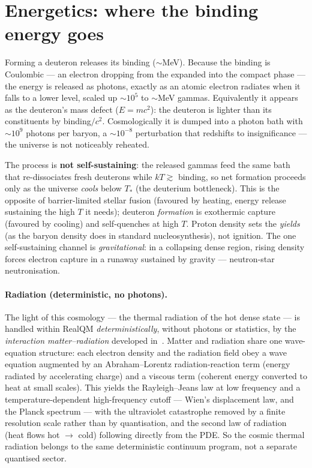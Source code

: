 \documentclass[11pt]{article}
\begin{document}
\section{Energetics: where the binding energy goes}\label{sec:energetics}
Forming a deuteron releases its binding (${\sim}$MeV). Because the binding is Coulombic --- an
electron dropping from the expanded into the compact phase --- the energy is released as photons,
exactly as an atomic electron radiates when it falls to a lower level, scaled up ${\sim}10^5$ to
${\sim}$MeV gammas. Equivalently it appears as the deuteron's mass defect ($E=mc^2$): the deuteron is
lighter than its constituents by binding$/c^2$. Cosmologically it is dumped into a photon bath with
${\sim}10^9$ photons per baryon, a ${\sim}10^{-8}$ perturbation that redshifts to insignificance ---
the universe is not noticeably reheated.

The process is \textbf{not self-sustaining}: the released gammas feed the same bath that re-dissociates
fresh deuterons while $kT\gtrsim$ binding, so net formation proceeds only as the universe \emph{cools}
below $T_\ast$ (the deuterium bottleneck). This is the opposite of barrier-limited stellar fusion
(favoured by heating, energy release sustaining the high $T$ it needs); deuteron \emph{formation} is
exothermic capture (favoured by cooling) and self-quenches at high $T$. Proton density sets the
\emph{yields} (as the baryon density does in standard nucleosynthesis), not ignition. The one
self-sustaining channel is \emph{gravitational}: in a collapsing dense region, rising density forces
electron capture in a runaway sustained by gravity --- neutron-star neutronisation.

\paragraph{Radiation (deterministic, no photons).} The light of this cosmology --- the thermal radiation of
the hot dense state --- is handled within RealQM \emph{deterministically},
without photons or statistics, by the \emph{interaction matter--radiation} developed in~\cite{realqm}. Matter
and radiation share one wave-equation structure: each electron density and the radiation field obey a wave
equation augmented by an Abraham--Lorentz radiation-reaction term (energy radiated by accelerating charge) and a
viscous term (coherent energy converted to heat at small scales). This yields the Rayleigh--Jeans law at low
frequency and a temperature-dependent high-frequency cutoff --- Wien's displacement law, and the Planck spectrum
--- with the ultraviolet catastrophe removed by a finite resolution scale rather than by quantisation, and the
second law of radiation (heat flows hot $\to$ cold) following directly from the PDE. So the cosmic thermal
radiation belongs to the same deterministic continuum program, not a separate quantised sector.
\end{document}
